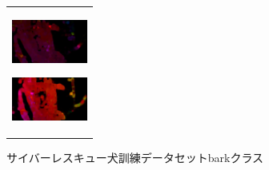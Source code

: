 \begin{figure}[H]
\begin{tabular}{l}
\begin{minipage}{0.165\hsize}
        \begin{center}
          \includegraphics[clip, width=2.5cm]{./Figures/optic_bark4.eps}
          \hspace{0.1cm} { }
        \end{center}
      \end{minipage}
      \begin{minipage}{0.165\hsize}
        \begin{center}
          \includegraphics[clip, width=2.5cm]{./Figures/optic_bark5.eps}
          \hspace{2.2cm} { }
        \end{center}
      \end{minipage}
    \end{tabular}
    \caption{サイバーレスキュー犬訓練データセットbarkクラス}
    \label{bark}
\end{figure}


